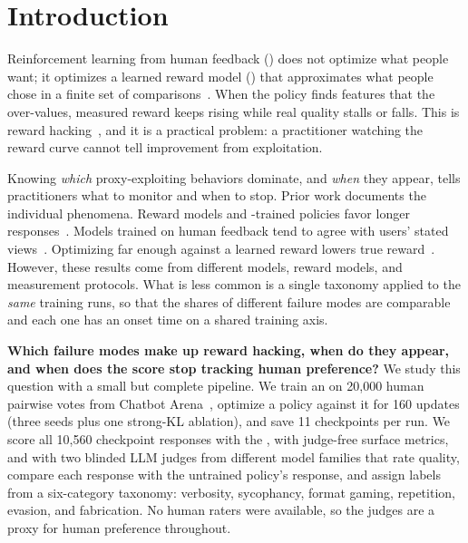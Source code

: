\section{Introduction}
\label{sec:intro}

Reinforcement learning from human feedback (\rlhf) does not optimize what people want; it optimizes a learned reward model (\rmodel) that approximates what people chose in a finite set of comparisons~\citep{christiano2017deep,stiennon2020learning,ouyang2022training}.
When the policy finds features that the \rmodel over-values, measured reward keeps rising while real quality stalls or falls.
This is reward hacking~\citep{amodei2016concrete,skalse2022defining}, and it is a practical problem: a practitioner watching the reward curve cannot tell improvement from exploitation.

Knowing \emph{which} proxy-exploiting behaviors dominate, and \emph{when} they appear, tells practitioners what to monitor and when to stop.
Prior work documents the individual phenomena.
Reward models and \rlhf-trained policies favor longer responses~\citep{singhal2023long}.
Models trained on human feedback tend to agree with users' stated views~\citep{perez2022discovering,sharma2023towards}.
Optimizing far enough against a learned reward lowers true reward~\citep{gao2023scaling,moskovitz2023confronting}.
However, these results come from different models, reward models, and measurement protocols.
What is less common is a single taxonomy applied to the \emph{same} training runs, so that the shares of different failure modes are comparable and each one has an onset time on a shared training axis.

{\bf Which failure modes make up reward hacking, when do they appear, and when does the \rmodel score stop tracking human preference?}
We study this question with a small but complete \rlhf pipeline.
We train an \rmodel on 20,000 human pairwise votes from Chatbot Arena~\citep{chiang2024chatbot}, optimize a \qwensmall policy against it for 160 updates (three seeds plus one strong-KL ablation), and save 11 checkpoints per run.
We score all 10,560 checkpoint responses with the \rmodel, with judge-free surface metrics, and with two blinded LLM judges from different model families that rate quality, compare each response with the untrained policy's response, and assign labels from a six-category taxonomy: verbosity, sycophancy, format gaming, repetition, evasion, and fabrication.
No human raters were available, so the judges are a proxy for human preference throughout.

